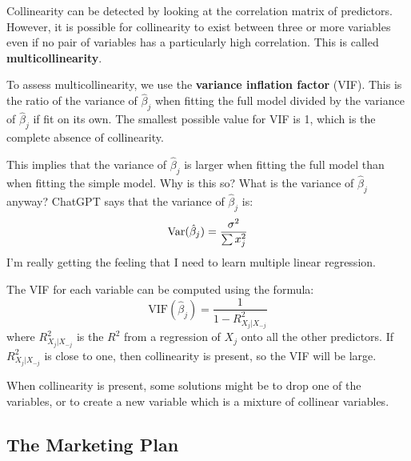\documentclass[10pt]{article}
\newcommand{\Var}{{\rm Var}}
\begin{document}
\begin{enumerate}
\begin{itemize}
		Collinearity can be detected by looking at the correlation matrix of predictors.  However, it is possible for collinearity to exist between three or more variables even if no pair of variables has a particularly high correlation.  This is called \textbf{multicollinearity}. 
		
		To assess multicollinearity, we use the \textbf{variance inflation factor} (VIF).  This is the ratio of the variance of $\hat\beta_j$ when fitting the full model divided by the variance of $\hat \beta_j$ if fit on its own.  The smallest possible value for VIF is 1, which is the complete absence of collinearity.
		
		{\color{brown} This implies that the variance of $\hat \beta_j$ is larger when fitting the full model than when fitting the simple model.  Why is this so?  What is the variance of $\hat \beta_j$ anyway?  ChatGPT says that the variance of $\hat\beta_j$ is:
		$$\Var(\hat \beta_j) = \dfrac{\sigma^2}{\sum x_j^2}$$  I'm really getting the feeling that I need to learn multiple linear regression.}

		The VIF for each variable can be computed using the formula:
		$$\mathrm{VIF}(\hat\beta_j) = \dfrac{1}{1 - R_{X_j | X_{-j}}^2} $$
		where $R_{X_j | X_{-j}}^2$ is the $R^2$ from a regression of $X_j$ onto all the other predictors.  If $R_{X_j | X_{-j}}^2$ is close to one, then collinearity is present, so the VIF will be large.

		When collinearity is present, some solutions might be to drop one of the variables, or to create a new variable which is a mixture of collinear variables.  
	\end{itemize}
\end{enumerate}

\vspace{.2in} 

\subsection{The Marketing Plan}

\vspace{.2in} 
\end{document}
